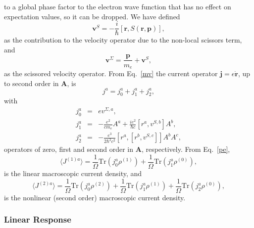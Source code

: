 \documentclass[floatfix,prb,aps,superscriptaddress,11pt]{revtex4}
\begin{document}
to a global phase factor to the electron wave function that has
no effect on expectation values, so it can be dropped. We
have defined 
\begin{equation}
\mathbf{v}^{S}=-\frac{i}{\hbar }[\mathbf{r},S(\mathbf{r},\mathbf{p})],  
\label{vnl}
\end{equation}
as the contribution to the velocity operator due to the non-local scissors
term, and 
\begin{equation}
\mathbf{v}^{\Sigma }=\frac{\mathbf{p}}{m_e}+\mathbf{v}^{S},  
\label{vs}
\end{equation}
as the scissored velocity operator. 
 From Eq.~\eqref{mv} the current operator 
$\mathbf{j}=e\dot{\mathbf{r}}$, up to second order in $\mathbf{A}$, is 
\begin{equation*}
j^{a}=j_{0}^{a}+j_{1}^{a}+j_{2}^{a},  \label{j2nl}
\end{equation*}
with 
\begin{eqnarray*}
j_{0}^{a} &=&ev^{\Sigma ,a},  \label{jotas} \\
j_{1}^{a} &=&-\frac{e^{2}}{cm_e}A^{a}+\frac{ie^{2}}{\hbar c}
[r^{a},v^{S,b}]A^{b}, \\
j_{2}^{a} &=&-\frac{e^{3}}{2\hbar ^{2}c^{2}}
[r^{a},[r^{b},v^{S,c}]]A^{b}A^{c},
\end{eqnarray*}
operators of zero, first and second order in $\mathbf{A}$, respectively. 
From Eq.~\eqref{pe}, 
\begin{equation}
\langle{J}^{(1)a}\rangle=\frac{1}{\Omega}\mbox{Tr}(j_{0}^{a}{\rho}^{(1)})+\frac{1}{\Omega}
\mbox{Tr}(j_{1}^{a}{\rho}^{(0)}),  \label{jmacl}
\end{equation}
is the linear macroscopic current density, and 
\begin{equation}
\langle{J}^{(2)a}\rangle=\frac{1}{\Omega}\mbox{Tr}(j_{0}^{a}{\rho}^{(2)})+\frac{1}{\Omega}
\mbox{Tr}(j_{1}^{a}{\rho}^{(1)})+\frac{1}{\Omega}\mbox{Tr}(j_{2}^{a}{\rho}^{(0)}),
\label{jmacnl}
\end{equation}
is the nonlinear (second order) macroscopic current density.

\subsubsection{Linear Response}
\end{document}
